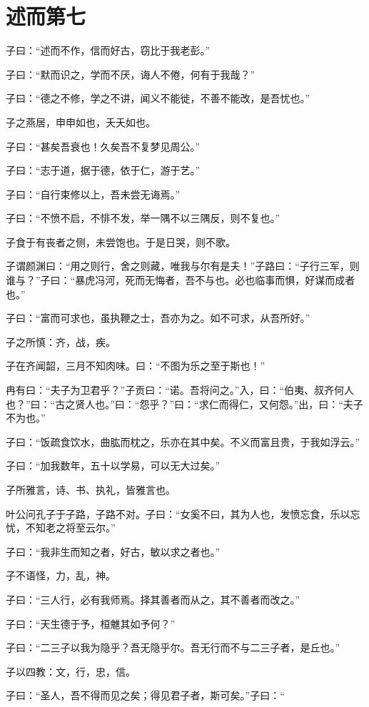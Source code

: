\documentclass[twoside,openany]{book}
\begin{document}
\chapter{述而第七}\label{ch7}

子曰：“述而不作，信而好古，窃比于我老彭。”

子曰：“默而识之，学而不厌，诲人不倦，何有于我哉？”

子曰：“德之不修，学之不讲，闻义不能徙，不善不能改，是吾忧也。”

子之燕居，申申如也，夭夭如也。

子曰：“甚矣吾衰也！久矣吾不复梦见周公。”

子曰：“志于道，据于德，依于仁，游于艺。”

子曰：“自行束修以上，吾未尝无诲焉。”

子曰：“不愤不启，不悱不发，举一隅不以三隅反，则不复也。”

子食于有丧者之侧，未尝饱也。于是日哭，则不歌。

子谓颜渊曰：“用之则行，舍之则藏，唯我与尔有是夫！”子路曰：“子行三军，则谁与？”子曰：“暴虎冯河，死而无悔者，吾不与也。必也临事而惧，好谋而成者也。”

子曰：“富而可求也，虽执鞭之士，吾亦为之。如不可求，从吾所好。”

子之所慎：齐，战，疾。

子在齐闻韶，三月不知肉味。曰：“不图为乐之至于斯也！”

冉有曰：“夫子为卫君乎？”子贡曰：“诺。吾将问之。”入，曰：“伯夷、叔齐何人也？”曰：“古之贤人也。”曰：“怨乎？”曰：“求仁而得仁，又何怨。”出，曰：“夫子不为也。”

子曰：“饭疏食饮水，曲肱而枕之，乐亦在其中矣。不义而富且贵，于我如浮云。”

子曰：“加我数年，五十以学易，可以无大过矣。”

子所雅言，诗、书、执礼，皆雅言也。

叶公问孔子于子路，子路不对。子曰：“女奚不曰，其为人也，发愤忘食，乐以忘忧，不知老之将至云尔。”

子曰：“我非生而知之者，好古，敏以求之者也。”

子不语怪，力，乱，神。

子曰：“三人行，必有我师焉。择其善者而从之，其不善者而改之。”

子曰：“天生德于予，桓魋其如予何？”

子曰：“二三子以我为隐乎？吾无隐乎尔。吾无行而不与二三子者，是丘也。”

子以四教：文，行，忠，信。

子曰：“圣人，吾不得而见之矣；得见君子者，斯可矣。”子曰：“
\end{document}
